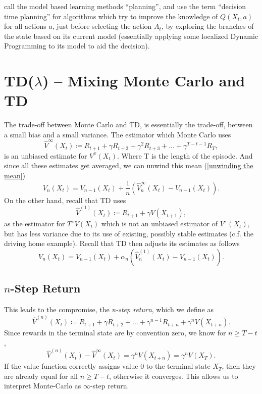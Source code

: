 \textcite{suttonReinforcementLearningIntroduction1998} call the model based learning methods ``planning'', and use the term ``decision time planning'' for algorithms which try to improve the knowledge of \(Q(X_t,a)\) for all actions \(a\), just before selecting the action \(A_t\), by exploring the branches of the state based on its current model (essentially applying some localized Dynamic Programming to its model to aid the decision).



\section{TD(\(\lambda\)) --  Mixing Monte Carlo and TD} 
The trade-off between Monte Carlo and TD, is essentially the trade-off, between a small bias and a small variance. 
The estimator which Monte Carlo uses 
\[
	\hat{V}^\infty (X_t) \coloneqq R_{t+1} + \gamma R_{t+2} + \gamma^2 R_{t+3} + \dotsc + \gamma^{T-t-1} R_T,
\]
is an unbiased estimate for \(V^\pi(X_t)\). Where T is the length of the episode. And since all these estimates get averaged, we can unwind this mean (\ref{unwinding the mean})
\[
	V_n(X_t) = V_{n-1}(X_t) + \frac{1}{n}(\hat{V}_n^\infty (X_t)- V_{n-1}(X_t)).
\]
On the other hand, recall that TD uses 
\[
	\hat{V}^{(1)}(X_t)\coloneqq R_{t+1} + \gamma V(X_{t+1}),
\]
as the estimator for \(T^\pi V(X_t)\) which is not an unbiased estimator of \(V^\pi(X_t)\), but has less variance due to its use of existing, possibly stable estimates (c.f. the driving home example). Recall that TD then adjusts its estimates as follows
\[
	V_n(X_t)=V_{n-1}(X_t) + \alpha_n (\hat{V}_n^{(1)}(X_t) - V_{n-1}(X_t)).
\]
\subsection{\(n\)-Step Return}
This leads to the compromise, the \emph{n-step return}, which we define as 
\[
	\hat{V}^{(n)}(X_t)\coloneqq R_{t+1} +\gamma R_{t+2} + \dotsc + \gamma^{n-1}R_{t+n}+ \gamma^n V(X_{t+n}).
\]
Since rewards in the terminal state are by convention zero, we know for \(n\ge T-t\),
\[
	\hat{V}^{(n)}(X_t)-\hat{V}^\infty(X_t) = \gamma^n V(X_{t+n}) = \gamma^n V(X_T).
\]
If the value function correctly assigns value \(0\) to the terminal state \(X_T\), then they are already equal for all \(n\ge T-t\), otherwise it converges. This allows us to interpret Monte-Carlo as \(\infty\)-step return.


